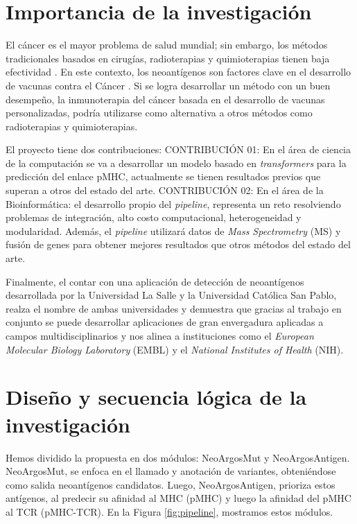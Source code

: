 \documentclass[a4paper,11pt]{article}
\begin{document}
	
\section{Importancia de la investigación}

El cáncer es el mayor problema de salud mundial; sin embargo, los métodos tradicionales basados en cirugías, radioterapias y quimioterapias tienen baja efectividad \citep{peng2019neoantigen}. En este contexto, los neoantígenos son factores clave en el desarrollo de vacunas contra el Cáncer  \citep{borden2022cancer,chen2021challenges,gopanenko2020main}. Si se logra desarrollar un método con un buen desempeño, la inmunoterapia del cáncer basada en el desarrollo de vacunas personalizadas, podría utilizarse como alternativa a otros métodos como radioterapias y quimioterapias. 

El proyecto tiene dos contribuciones: CONTRIBUCIÓN 01: En el área de ciencia de la computación se va a desarrollar un modelo basado en \textit{transformers} para la predicción del enlace pMHC, actualmente se tienen resultados previos que superan a otros del estado del arte. CONTRIBUCIÓN 02: En el área de la Bioinformática: el desarrollo propio del \textit{pipeline}, representa un reto resolviendo problemas de integración, alto costo computacional, heterogeneidad y modularidad. Además,  el \textit{pipeline} utilizará datos de \textit{Mass Spectrometry} (MS) y fusión de genes para obtener mejores resultados que otros métodos del estado del arte.

Finalmente, el contar con una aplicación de detección de neoantígenos desarrollada por la Universidad La Salle y la Universidad Católica San Pablo, realza el nombre de ambas universidades y demuestra que gracias al trabajo en conjunto se puede desarrollar aplicaciones de gran envergadura aplicadas a campos multidisciplinarios y nos alinea a instituciones como el \textit{European Molecular Biology Laboratory} (EMBL) y el \textit{National Institutes of Health} (NIH).



\section{Diseño y secuencia lógica de la investigación} 






Hemos dividido la propuesta en dos módulos: NeoArgosMut y NeoArgosAntigen. NeoArgosMut, se enfoca en el llamado y anotación de variantes, obteniéndose como salida neoantígenos candidatos. Luego, NeoArgosAntigen, prioriza estos antígenos, al predecir su afinidad al MHC (pMHC) y luego la afinidad del pMHC al TCR (pMHC-TCR). En la Figura \ref{fig:pipeline}, mostramos estos módulos. 
\end{document}
